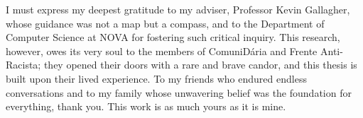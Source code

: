 
%

\begin{ntacknowledgements}

I must express my deepest gratitude to my adviser, Professor Kevin Gallagher,
whose guidance was not a map but a compass, and to the Department of Computer
Science at NOVA for fostering such critical inquiry. This research, however,
owes its very soul to the members of ComuniDária and Frente Anti-Racista; they
opened their doors with a rare and brave candor, and this thesis is built upon
their lived experience. To my friends who endured endless conversations and to
my family whose unwavering belief was the foundation for everything, thank you.
This work is as much yours as it is mine.

\end{ntacknowledgements}